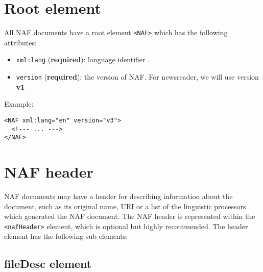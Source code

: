
\section{Root element}
\label{sec:root-element}

All NAF documents have a root element \texttt{<NAF>} which has the following
attributes:

\begin{itemize}
\item \texttt{xml:lang} (\textbf{required}): language identifier .
\item \texttt{version} (\textbf{required}): the version of NAF. For
  newsreader, we will use version \textbf{v1}
\end{itemize}

Example:
\begin{Verbatim}[fontsize=\small]
<NAF xml:lang="en" version="v3">
  <!--- ... --->
</NAF>
\end{Verbatim}

\section{NAF header}
\label{sec:naf-header}

NAF documents may have a header for describing information about the
document, such as its original name, URI or a list of the linguistic
processors which generated the NAF document. The NAF header is represented
within the \texttt{<nafHeader>} element, which is optional but highly
recommended. The header element has the following sub-elements:

\subsection{fileDesc element}
\label{sec:filedesc-element}

